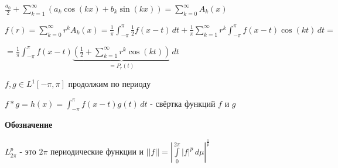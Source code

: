 \begin{example}
    $\frac{a_0}{2} + \sum\limits_{k = 1}^\infty (a_k \cos (kx) + b_k \sin (kx)) = \sum\limits_{k = 0}^\infty A_k (x)$

    $f(r) = \sum\limits_{k = 0}^\infty r^k A_k (x) = \frac{1}{\pi} \int_{-\pi}^\pi \frac{1}{2} f(x - t) \, dt + \frac{1}{\pi} \sum\limits_{k=1}^\infty r^k \int_{-\pi}^\pi f(x - t) \cos (kt) \, dt = $
    
    $= \frac{1}{\pi} \int_{-\pi}^\pi f(x - t) \underbrace{\left( \frac{1}{2} + \sum\limits_{k = 1}^\infty r^k \cos (kt) \right)}_{= P_r (t)} \, dt$
\end{example}

\begin{definition}
    $f, g \in L^1 [-\pi, \pi]$ продолжим по периоду

    $f * g = h(x) = \int_{-\pi}^\pi f(x - t) g(t) \, dt$ - свёртка функций $f$ и $g$
\end{definition}

\begin{remark}
    \textbf{Обозначение}

    $L_{2\pi}^p$ - это $2\pi$ периодические функции и $||f|| = \left| \int\limits_0^{2\pi} |f|^p \, d \mu \right|^{\frac{1}{p}}$
\end{remark}

